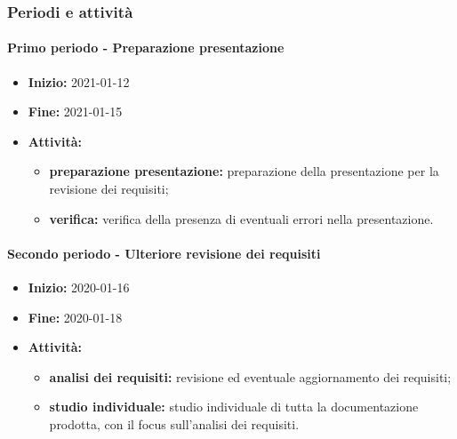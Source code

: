 \subsubsection{Periodi e attività}

\paragraph[Primo periodo]{Primo periodo - \textnormal{Preparazione presentazione}}
\begin{itemize}
    \item [] \textbf{Inizio:} 2021-01-12
    \item [] \textbf{Fine:} 2021-01-15
    \item [] \textbf{Attività:}
          \begin{itemize}
              \item \textbf{preparazione presentazione:} preparazione della presentazione per la revisione dei requisiti;
              \item \textbf{verifica:} verifica della presenza di eventuali errori nella presentazione.
          \end{itemize}
\end{itemize}

\paragraph[Secondo periodo]{Secondo periodo - \textnormal{Ulteriore revisione dei requisiti}}
\begin{itemize}
    \item [] \textbf{Inizio:} 2020-01-16
    \item [] \textbf{Fine:} 2020-01-18
    \item [] \textbf{Attività:}
          \begin{itemize}
              \item \textbf{analisi dei requisiti:} revisione ed eventuale aggiornamento dei requisiti;
              \item \textbf{studio individuale:} studio individuale di tutta la documentazione prodotta, con il focus sull'analisi dei requisiti.
          \end{itemize}
\end{itemize}



